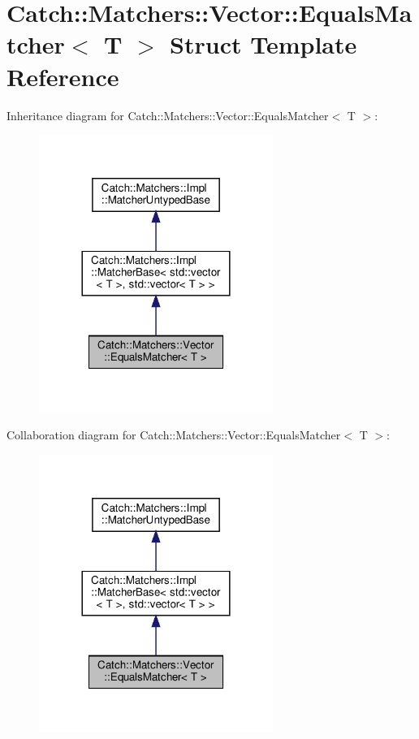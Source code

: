 \hypertarget{structCatch_1_1Matchers_1_1Vector_1_1EqualsMatcher}{}\section{Catch\+:\+:Matchers\+:\+:Vector\+:\+:Equals\+Matcher$<$ T $>$ Struct Template Reference}
\label{structCatch_1_1Matchers_1_1Vector_1_1EqualsMatcher}


Inheritance diagram for Catch\+:\+:Matchers\+:\+:Vector\+:\+:Equals\+Matcher$<$ T $>$\+:
\nopagebreak
\begin{figure}[H]
\begin{center}
\leavevmode
\includegraphics[width=216pt]{structCatch_1_1Matchers_1_1Vector_1_1EqualsMatcher__inherit__graph}
\end{center}
\end{figure}


Collaboration diagram for Catch\+:\+:Matchers\+:\+:Vector\+:\+:Equals\+Matcher$<$ T $>$\+:
\nopagebreak
\begin{figure}[H]
\begin{center}
\leavevmode
\includegraphics[width=216pt]{structCatch_1_1Matchers_1_1Vector_1_1EqualsMatcher__coll__graph}
\end{center}
\end{figure}
